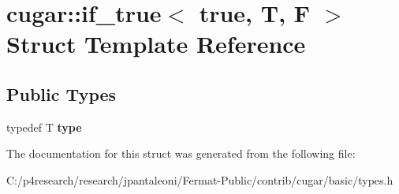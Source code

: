 \hypertarget{structcugar_1_1if__true_3_01true_00_01_t_00_01_f_01_4}{}\section{cugar\+:\+:if\+\_\+true$<$ true, T, F $>$ Struct Template Reference}
\label{structcugar_1_1if__true_3_01true_00_01_t_00_01_f_01_4}
\subsection*{Public Types}
\begin{DoxyCompactItemize}
\item 
\mbox{\label{structcugar_1_1if__true_3_01true_00_01_t_00_01_f_01_4_abbc659c224facd1da4ee95298bcf0dbc}} 
typedef T {\bfseries type}
\end{DoxyCompactItemize}


The documentation for this struct was generated from the following file\+:\begin{DoxyCompactItemize}
\item 
C\+:/p4research/research/jpantaleoni/\+Fermat-\/\+Public/contrib/cugar/basic/types.\+h\end{DoxyCompactItemize}
